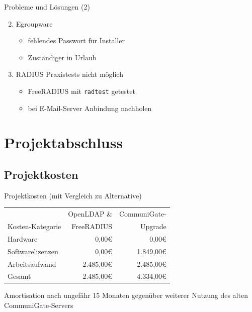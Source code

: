 \documentclass[presentation,svgnames,12pt]{beamer}
\begin{document}
\begin{frame}{Probleme und Lösungen (2)}
\begin{enumerate}
	\setcounter{enumi}{1}
	\item Egroupware
	\vspace{6pt}
	\begin{itemize}
		\item fehlendes Passwort für Installer
		\item Zuständiger in Urlaub
	\end{itemize}
	\medskip
	\item RADIUS Praxistests nicht möglich
	\vspace{6pt}
	\begin{itemize}
		\item FreeRADIUS mit \texttt{radtest} getestet
		\item bei E-Mail-Server Anbindung nachholen
	\end{itemize}
\end{enumerate}
\end{frame}

\section{Projektabschluss}
\subsection{Projektkosten}
\begin{frame}{Projektkosten (mit Vergleich zu Alternative)}
\begin{table}
\centering
	\begin{tabularx}{0.9\textwidth}{|X|r|r|}
		\hline
		 	&	OpenLDAP \& &	CommuniGate-\\
		Kosten-Kategorie	&	FreeRADIUS &	Upgrade\\
		\hline
		Hardware &	0,00\euro{} &	0,00\euro{}\\
		\hline
		Softwarelizenzen &	0,00\euro{} &	1.849,00\euro{}\\
		\hline
		Arbeitsaufwand &	2.485,00\euro{} &	2.485,00\euro{}\\
		\hhline{|=|=|=|}
		Gesamt &	2.485,00\euro{} &	4.334,00\euro{}\\
		\hline
	\end{tabularx}
\end{table}
\bigskip
Amortisation nach ungefähr 15 Monaten gegenüber weiterer Nutzung des alten CommuniGate-Servers
\end{frame}
\end{document}
